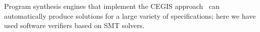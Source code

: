 \documentclass[review]{elsarticle}
\begin{document}
Program synthesis engines that implement the CEGIS approach~\cite{sketch} can automatically produce solutions for a large variety of specifications; %
here we have used software verifiers based on SMT solvers.%
%
\end{document}
